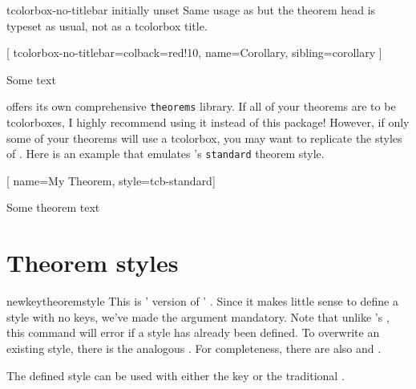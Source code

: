 \documentclass{ltxdoc}
\begin{document}
\begin{docKey}{tcolorbox-no-titlebar}
  {}
  {initially unset}
Same usage as  but the theorem head is typeset as usual, not as a tcolorbox title.

\begin{codepreamble}
[
  tcolorbox-no-titlebar={colback=red!10},
  name=Corollary, sibling=corollary
  ]
\end{codepreamble}

\begin{keythmscode}[withpreamble]
\begin{boxcor}
Some text
\end{boxcor}
\end{keythmscode}

\end{docKey}

 offers its own comprehensive \texttt{theorems} library. If all of your theorems are to be tcolorboxes, I highly recommend using it instead of this package! However, if only some of your theorems will use a tcolorbox, you may want to replicate the styles of . Here is an example that emulates 's \texttt{standard} theorem style.

\begin{codepreamble}
[
  name=My Theorem,
  style=tcb-standard]
\end{codepreamble}

\begin{keythmscode}[withpreamble]
\begin{mytheo}
Some theorem text
\end{mytheo}
\end{keythmscode}

\section{Theorem styles}
\label{thmstyles}

\begin{docCommand}{newkeytheoremstyle}
  {}
This is ' version of ' .
Since it makes little sense to define a style with no keys, we've made the  argument mandatory.
Note that unlike 's , this command will error if a style has already been defined.
To overwrite an existing style, there is the analogous .
For completeness, there are also  and .

The defined style can be used with either the  key or the traditional .
\end{docCommand}
\end{document}
